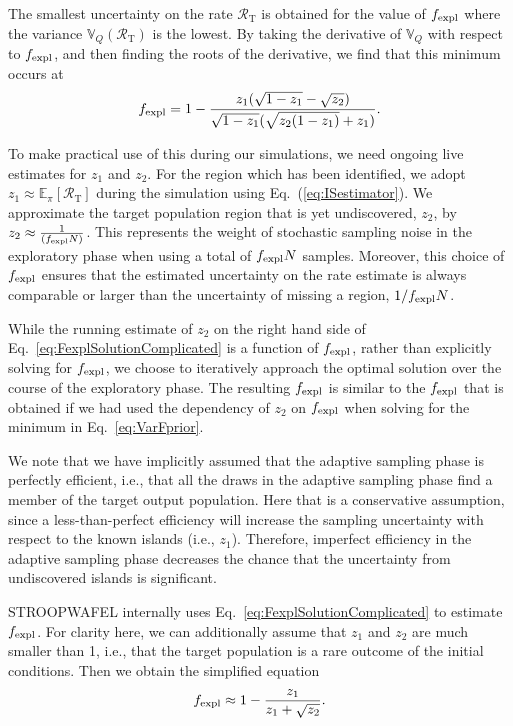 \documentclass[a4paper,fleqn,usenatbib,useAMS,usedcolumn]{mnras}
\newcommand\rate{\mathcal{R}}
\newcommand{\AISs}{\textsc{STROOPWAFEL}}
\begin{document}
The smallest uncertainty on the rate $\rate_{\text{T}}$ is obtained for the value of $f_{\rm{expl}}$ where the variance $\mathbb{V}_Q(\rate_{\text{T}})$ is the lowest. 
By taking the derivative of $\mathbb{V}_Q$ with respect to $f_{\rm{expl}}$, and then finding the roots of the derivative, we find that this minimum occurs at
%
\begin{equation}
	f_{\rm{expl}} =  1 - \frac{z_1 (\sqrt{1-z_1} - \sqrt{z_2})}{\sqrt{1-z_1}(\sqrt{z_2(1-z_1)} +z_1)} . 
	\label{eq:FexplSolutionComplicated}
\end{equation}
%

To make practical use of this during our simulations, we need ongoing live estimates for $z_1$ and $z_2$.   For the region which has been identified, we adopt $z_1 \approx {\mathbb{E}_{\pi}[\rate_{\text{T}}]}$ during the simulation using Eq.~(\ref{eq:ISestimator}). We approximate the target population region that is yet undiscovered, $z_2$, by $z_2 \approx \frac{1}{(f_{\rm{expl}} N)}$. This represents the weight of stochastic sampling noise in the exploratory phase when using a total of $f_{\rm{expl}} N$ samples. 
Moreover, this choice of $f_{\rm{expl}}$ ensures that the estimated uncertainty on the rate estimate  is always comparable or larger than the uncertainty of missing a region, $ 1 / f_{\rm{expl}} N $. 

While the running estimate of $z_2$ on the right hand side of Eq.~\ref{eq:FexplSolutionComplicated}  is a function of $f_{\rm{expl}}$, rather than explicitly solving for  $f_{\rm{expl}}$, we choose to iteratively approach the optimal solution over the course of the exploratory phase. The resulting $f_{\rm{expl}}$ is similar to the $f_{\rm{expl}}$ that is obtained  if we had used the dependency of $z_2$ on  $f_{\rm{expl}}$ when solving for the minimum in Eq.~\ref{eq:VarFprior}. 

We note that we have implicitly assumed that the adaptive sampling phase is perfectly efficient, i.e., that all the draws in the adaptive sampling phase find a member of the target output population.   Here that is a conservative assumption, since a less-than-perfect efficiency will increase the sampling uncertainty with respect to the known islands (i.e., $z_1$).   Therefore, imperfect efficiency in the adaptive sampling phase decreases the chance that the uncertainty from undiscovered islands is significant.  

\AISs{} internally uses Eq.~\ref{eq:FexplSolutionComplicated} to estimate $f_{\rm{expl}}$.  For clarity here, we can additionally assume that $z_1$ and $z_2$ are much smaller than 1, i.e., that the target population is a rare outcome of the initial conditions.  Then we obtain the simplified equation
\begin{equation}
	f_{\rm{expl}}   \approx 1-  \frac{z_1}{z_1 + \sqrt{z_2}}    .
	\label{eq:FexplSolutionSimple}
\end{equation}
\end{document}
